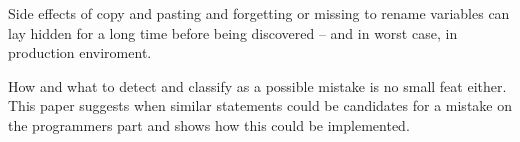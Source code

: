\documentclass[a4paper,11pt]{article}
\theoremstyle{mytheor}
\begin{document}
Side effects of copy and pasting and forgetting or missing to rename variables can lay hidden for a long time before being discovered -- and in worst case, in production enviroment.

How and what to detect and classify as a possible mistake is no small feat either.
This paper suggests when similar statements could be candidates for a mistake on the programmers part
and shows how this could be implemented.
\end{document}
